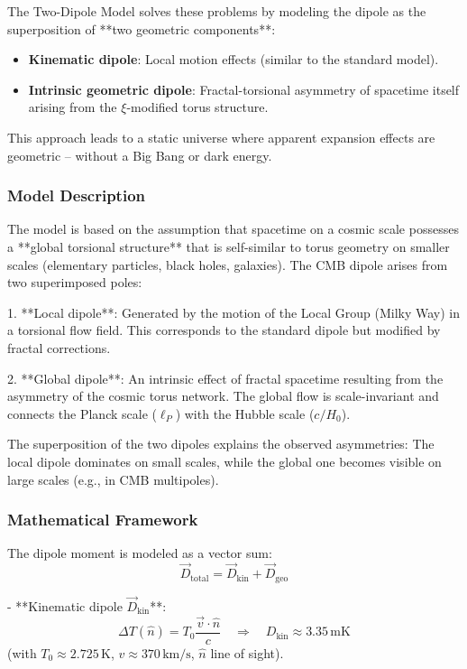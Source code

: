 \documentclass[12pt,a4paper]{article}
\begin{document}
The Two-Dipole Model solves these problems by modeling the dipole as the superposition of **two geometric components**:
\begin{itemize}
	\item \textbf{Kinematic dipole}: Local motion effects (similar to the standard model).
	\item \textbf{Intrinsic geometric dipole}: Fractal-torsional asymmetry of spacetime itself arising from the $\xi$-modified torus structure.
\end{itemize}

This approach leads to a static universe where apparent expansion effects are geometric – without a Big Bang or dark energy.

\subsubsection{Model Description}

The model is based on the assumption that spacetime on a cosmic scale possesses a **global torsional structure** that is self-similar to torus geometry on smaller scales (elementary particles, black holes, galaxies). The CMB dipole arises from two superimposed poles:

1. **Local dipole**: Generated by the motion of the Local Group (Milky Way) in a torsional flow field. This corresponds to the standard dipole but modified by fractal corrections.

2. **Global dipole**: An intrinsic effect of fractal spacetime resulting from the asymmetry of the cosmic torus network. The global flow is scale-invariant and connects the Planck scale ($\ell_P$) with the Hubble scale ($c/H_0$).

The superposition of the two dipoles explains the observed asymmetries: The local dipole dominates on small scales, while the global one becomes visible on large scales (e.g., in CMB multipoles).

\subsubsection{Mathematical Framework}

The dipole moment is modeled as a vector sum:
\begin{equation}
	\vec{D}_{\text{total}} = \vec{D}_{\text{kin}} + \vec{D}_{\text{geo}}
	\label{eq:two_dipole}
\end{equation}

- **Kinematic dipole $\vec{D}_{\text{kin}}$**:
\[
\Delta T(\hat{n}) = T_0 \frac{\vec{v} \cdot \hat{n}}{c} \quad \Rightarrow \quad D_{\text{kin}} \approx 3.35\,\text{mK}
\]
(with $T_0 \approx 2.725\,\text{K}$, $v \approx 370\,\text{km/s}$, $\hat{n}$ line of sight).
\end{document}
